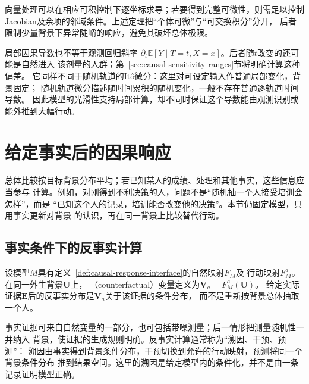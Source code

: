向量处理可以在相应可积控制下逐坐标求导；若要得到完整可微性，则需足以控制
Jacobian及余项的邻域条件。上述定理把“个体可微”与“可交换积分”分开，
后者限制少量背景下异常陡峭的响应，避免其破坏总体极限。

局部因果导数也不等于观测回归斜率
\(\partial_t\mathbb E[Y\mid T=t,X=x]\)。后者随\(t\)改变的还可能是自然进入
该剂量的人群；第~\ref{sec:causal-sensitivity-ranges}节将明确计算这种偏差。
它同样不同于随机轨道的It\^o微分：这里对可设定输入作普通局部变化，背景固定；
随机轨道微分描述随时间累积的随机变化，一般不存在普通逐轨道时间导数。
因此模型的光滑性支持局部计算，却不同时保证这个导数能由观测识别或能外推到大幅行动。

\section{给定事实后的因果响应}
\label{sec:causal-counterfactual-recourse}

总体比较按目标背景分布平均；若已知某人的成绩、处理和其他事实，这些信息应当参与
计算。例如，对刚得到不利决策的人，问题不是“随机抽一个人接受培训会怎样”，而是
“已知这个人的记录，培训能否改变他的决策”。本节仍固定模型，只用事实更新对背景
的认识，再在同一背景上比较替代行动。

\subsection{事实条件下的反事实计算}
\label{sec:causal-factual-counterfactual}

\begin{definition}[给定响应模型的反事实变量]
  \label{def:causal-counterfactual}
  设模型\(M\)具有定义~\ref{def:causal-response-interface}的自然映射\(F_M\)及
  行动映射\(F_M^a\)。在同一外生背景\(\bm U\)上，
  （counterfactual）变量定义为\(\bm V_a=F_M^a(\bm U)\)。
  给定实际证据\(\bm E\)后的反事实分布是\(\bm V_a\)关于该证据的条件分布，
  而不是重新按背景总体抽取一个人。
\end{definition}

事实证据可来自自然变量的一部分，也可包括带噪测量；后一情形把测量随机性一并纳入
背景，使证据的生成规则明确。反事实计算通常称为“溯因、干预、预测”：
溯因由事实得到背景条件分布，干预切换到允许的行动映射，预测将同一个背景条件分布
推到结果空间。这里的溯因是给定模型内的条件化，并不是由一条记录证明模型正确。

